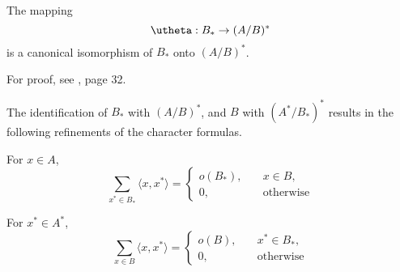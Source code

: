 \begin{theorem}
The mapping 
\[
\utheta: B_* \to (A/B)^*
\]
is a canonical isomorphism of $B_*$ onto $(A/B)^*$.
\end{theorem}
For proof, see \cite{Tolimieri:1998}, page 32.

The identification of $B_*$ with $(A/B)^*$, and $B$ with $(A^*/B_*)^*$ results
in the following refinements of the character formulas.
\begin{corollary}\label{cor:char1}
For $x\in A$,
\[
\sum_{x^*\in B_*} \langle x, x^* \rangle = 
\left\{\begin{array}{ll}
o(B_*),& \quad x \in B,\\
0,& \quad \text{otherwise}
\end{array}
\right.
\]
\end{corollary}
\begin{corollary}\label{cor:char2}
For $x^*\in A^*$,
\[
\sum_{x\in B} \langle x, x^* \rangle = 
\left\{\begin{array}{ll}
o(B),& \quad x^* \in B_*,\\
0,& \quad \text{otherwise}
\end{array}
\right.
\]
\end{corollary}

